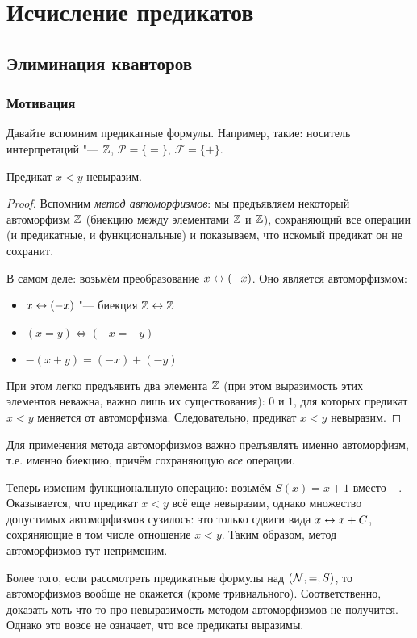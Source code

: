 \chapter{Исчисление предикатов}
\section{Элиминация кванторов}

\subsection{Мотивация}
Давайте вспомним предикатные формулы. Например, такие: носитель интерпретаций "--- $\mathbb{Z}$, $\mathcal P = \{ = \}$, $\mathcal F = \{ + \}$.
\begin{assertion}
	Предикат $x < y$ невыразим.
\end{assertion}
\begin{proof}
	Вспомним \textit{метод автоморфизмов}: мы предъявляем некоторый автоморфизм $\mathbb{Z}$ (биекцию между элементами $\mathbb{Z}$ и $\mathbb{Z}$), сохраняющий
	все операции (и предикатные, и функциональные) и показываем, что искомый предикат он не сохранит.

	В самом деле: возьмём преобразование $x \leftrightarrow (-x)$.
	Оно является автоморфизмом:
	\begin{itemize}
	\item $x \leftrightarrow (-x)$ "--- биекция $\mathbb{Z} \leftrightarrow \mathbb{Z}$
	\item $(x = y) \iff (-x = -y)$
	\item $-(x + y) = (-x) + (-y)$
	\end{itemize}
	При этом легко предъявить два элемента $\mathbb{Z}$ (при этом выразимость этих элементов неважна, важно лишь их существования): $0$ и $1$, для которых
	предикат $x < y$ меняется от автоморфизма.
	Следовательно, предикат $x < y$ невыразим.
\end{proof}
\begin{Rem}
	Для применения метода автоморфизмов важно предъявлять именно автоморфизм, т.е. именно биекцию, причём сохраняющую \textsl{все} операции.
\end{Rem}

Теперь изменим функциональную операцию: возьмём $S(x)=x+1$ вместо $+$.
Оказывается, что предикат $x < y$ всё еще невыразим, однако множество допустимых автоморфизмов сузилось: это только сдвиги вида $x \leftrightarrow x+C$,
сохряняющие в том числе отношение $x < y$.
Таким образом, метод автоморфизмов тут неприменим.

Более того, если рассмотреть предикатные формулы над $(\mathcal{N}, =, S)$, то автоморфизмов вообще не окажется (кроме тривиального).
Соответственно, доказать хоть что-то про невыразимость методом автоморфизмов не получится.
Однако это вовсе не означает, что все предикаты выразимы.

